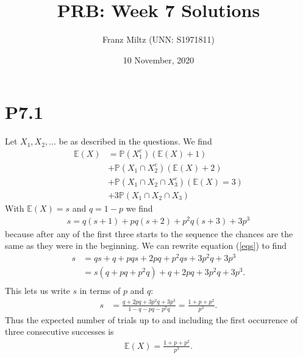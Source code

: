 \documentclass{article}
\renewcommand{\P}{\mathbb{P}}
\newcommand{\E}{\mathbb{E}}
\begin{document}
\title{PRB: Week 7 Solutions}
\author{Franz Miltz (UNN: S1971811)}
\date{10 November, 2020}
\maketitle
\section*{P7.1}
Let $X_1,X_2,...$ be as described in the questions. We find 
\begin{align*}
  \E(X) &= \P(X_1^c)(\E(X)+1)\\
        &+\P(X_1\cap X_2^c)(\E(X)+2)\\
        &+\P(X_1\cap X_2\cap X_3^c)(\E(X)=3)\\
        &+3\P(X_1\cap X_2\cap X_3)
\end{align*}
With $\E(X)=s$ and $q=1-p$ we find
\begin{align}
  \label{eqs}
  s = q(s+1) + pq(s+2) + p^2q(s+3) +3p^3
\end{align}
because after any of the first three starts to the sequence the chances 
are the same as they were in the beginning.
We can rewrite equation (\ref{eqs}) to find
\begin{align*}
  s &= qs + q + pqs + 2pq + p^2qs + 3p^2q + 3p^3\\
    &= s(q+pq+p^2q)+q + 2pq + 3p^2q + 3p^3.\\
\end{align*}
This lets us write $s$ in terms of $p$ and $q$:
\begin{align*}
  s &= \frac{q+2pq+3p^2q+3p^3}{1-q-pq-p^2q} =\frac{1+p+p^2}{p^3}.
\end{align*}
Thus the expected number of trials up to and including the first occurrence of
three consecutive successes is
\begin{align*}
  \E(X) = \frac{1+p+p^2}{p^3}.
\end{align*}
\end{document}
